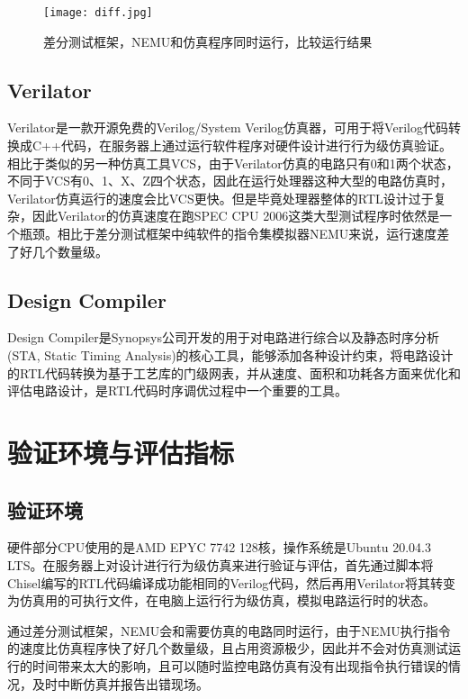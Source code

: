 \begin{figure}[htb]
	\centering
	\setlength\tabcolsep{3pt}  %
	\vspace{5pt} %
	\texttt{[image: diff.jpg]}
	\caption{差分测试框架，NEMU和仿真程序同时运行，比较运行结果}
	\label{fig:figure64}
\end{figure}

\subsection{Verilator}

Verilator\cite{verilator}是一款开源免费的Verilog/System Verilog仿真器，可用于将Verilog代码转换成C++代码，在服务器上通过运行软件程序对硬件设计进行行为级仿真验证。相比于类似的另一种仿真工具VCS\cite{vcs}，由于Verilator仿真的电路只有0和1两个状态，不同于VCS有0、1、X、Z四个状态，因此在运行处理器这种大型的电路仿真时，Verilator仿真运行的速度会比VCS更快。但是毕竟处理器整体的RTL设计过于复杂，因此Verilator的仿真速度在跑SPEC CPU 2006这类大型测试程序时依然是一个瓶颈。相比于差分测试框架中纯软件的指令集模拟器NEMU来说，运行速度差了好几个数量级。

\subsection{Design Compiler}

Design Compiler是Synopsys公司开发的用于对电路进行综合以及静态时序分析 (STA, Static Timing Analysis)的核心工具，能够添加各种设计约束，将电路设计的RTL代码转换为基于工艺库的门级网表，并从速度、面积和功耗各方面来优化和评估电路设计，是RTL代码时序调优过程中一个重要的工具。

\section{验证环境与评估指标}

\subsection{验证环境}

硬件部分CPU使用的是AMD EPYC 7742 128核，操作系统是Ubuntu 20.04.3 LTS。在服务器上对设计进行行为级仿真来进行验证与评估，首先通过脚本将Chisel编写的RTL代码编译成功能相同的Verilog代码，然后再用Verilator将其转变为仿真用的可执行文件，在电脑上运行行为级仿真，模拟电路运行时的状态。

通过差分测试框架，NEMU会和需要仿真的电路同时运行，由于NEMU执行指令的速度比仿真程序快了好几个数量级，且占用资源极少，因此并不会对仿真测试运行的时间带来太大的影响，且可以随时监控电路仿真有没有出现指令执行错误的情况，及时中断仿真并报告出错现场。

